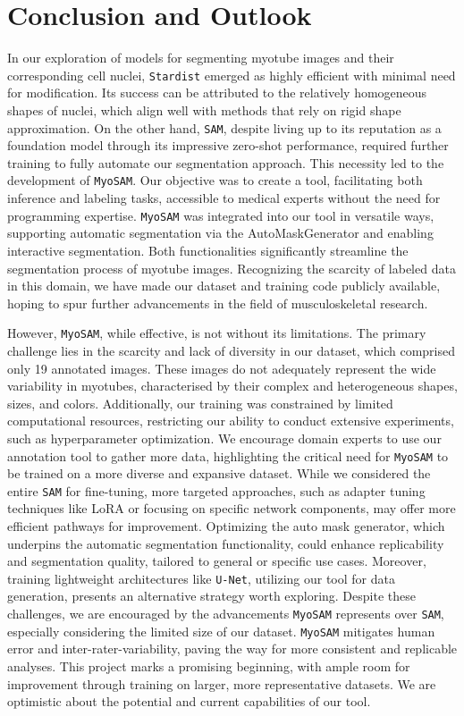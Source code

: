 \section{Conclusion and Outlook}
In our exploration of models for segmenting myotube images and their corresponding cell nuclei, \texttt{Stardist} emerged as highly efficient with minimal need for modification. Its success can be attributed to the relatively homogeneous shapes of nuclei, which align well with methods that rely on rigid shape approximation. On the other hand, \texttt{SAM}, despite living up to its reputation as a foundation model through its impressive zero-shot performance, required further training to fully automate our segmentation approach. This necessity led to the development of \texttt{MyoSAM}. Our objective was to create a tool, facilitating both inference and labeling tasks, accessible to medical experts without the need for programming expertise. \texttt{MyoSAM} was integrated into our tool in versatile ways, supporting automatic segmentation via the AutoMaskGenerator and enabling interactive segmentation. Both functionalities significantly streamline the segmentation process of myotube images. Recognizing the scarcity of labeled data in this domain, we have made our dataset and training code publicly available, hoping to spur further advancements in the field of musculoskeletal research.

However, \texttt{MyoSAM}, while effective, is not without its limitations. The primary challenge lies in the scarcity and lack of diversity in our dataset, which comprised only 19 annotated images. These images do not adequately represent the wide variability in myotubes, characterised by their complex and heterogeneous shapes, sizes, and colors. Additionally, our training was constrained by limited computational resources, restricting our ability to conduct extensive experiments, such as hyperparameter optimization.
We encourage domain experts to use our annotation tool to gather more data, highlighting the critical need for \texttt{MyoSAM} to be trained on a more diverse and expansive dataset. While we considered the entire \texttt{SAM} for fine-tuning, more targeted approaches, such as adapter tuning techniques like LoRA or focusing on specific network components, may offer more efficient pathways for improvement. Optimizing the auto mask generator, which underpins the automatic segmentation functionality, could enhance replicability and segmentation quality, tailored to general or specific use cases. Moreover, training lightweight architectures like \texttt{U-Net}, utilizing our tool for data generation, presents an alternative strategy worth exploring.
Despite these challenges, we are encouraged by the advancements \texttt{MyoSAM} represents over \texttt{SAM}, especially considering the limited size of our dataset. \texttt{MyoSAM} mitigates human error and inter-rater-variability, paving the way for more consistent and replicable analyses. This project marks a promising beginning, with ample room for improvement through training on larger, more representative datasets. We are optimistic about the potential and current capabilities of our tool.
